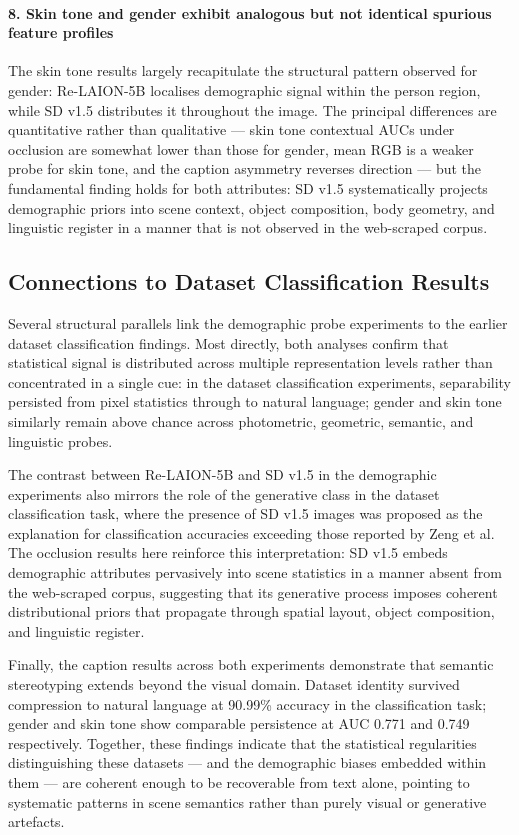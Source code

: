 \paragraph{8. Skin tone and gender exhibit analogous but not identical spurious feature
	profiles}

The skin tone results largely recapitulate the structural pattern observed for gender:
Re-LAION-5B localises demographic signal within the person region, while SD v1.5
distributes it throughout the image. The principal differences are quantitative rather
than qualitative --- skin tone contextual AUCs under occlusion are somewhat lower than
those for gender, mean RGB is a weaker probe for skin tone, and the caption asymmetry
reverses direction --- but the fundamental finding holds for both attributes: SD v1.5
systematically projects demographic priors into scene context, object composition, body
geometry, and linguistic register in a manner that is not observed in the web-scraped
corpus.

\subsection{Connections to Dataset Classification Results}

Several structural parallels link the demographic probe experiments to the earlier
dataset classification findings. Most directly, both analyses confirm that statistical
signal is distributed across multiple representation levels rather than concentrated in a
single cue: in the dataset classification experiments, separability persisted from pixel
statistics through to natural language; gender and skin tone similarly remain above chance
across photometric, geometric, semantic, and linguistic probes.

The contrast between Re-LAION-5B and SD v1.5 in the demographic experiments also mirrors
the role of the generative class in the dataset classification task, where the presence
of SD v1.5 images was proposed as the explanation for classification accuracies
exceeding those reported by Zeng et al. The occlusion results here reinforce this
interpretation: SD v1.5 embeds demographic attributes pervasively into scene statistics
in a manner absent from the web-scraped corpus, suggesting that its generative process
imposes coherent distributional priors that propagate through spatial layout, object
composition, and linguistic register.

Finally, the caption results across both experiments demonstrate that semantic
stereotyping extends beyond the visual domain. Dataset identity survived compression
to natural language at 90.99\% accuracy in the classification task; gender and skin tone
show comparable persistence at AUC 0.771 and 0.749 respectively. Together, these findings
indicate that the statistical regularities distinguishing these datasets --- and the
demographic biases embedded within them --- are coherent enough to be recoverable from
text alone, pointing to systematic patterns in scene semantics rather than purely visual
or generative artefacts.